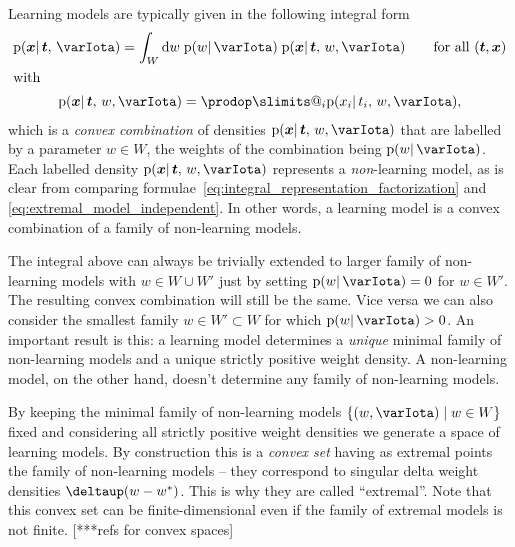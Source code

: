 \documentclass[\ifafour a4paper,12pt,\else a5paper,10pt,\fi%
onecolumn,oneside,article,%
british%
]{memoir}
\makeatletter
\theoremstyle{remark}
\theoremstyle{innote}
\def\prod{\DOTSI\prodop\slimits@}
\newcommand*{\delt}{\deltaup}%
\newcommand*{\di}{\mathrm{d}}%
\newcommand*{\suchthat}{\mid}%
\DeclarePairedDelimiter\set{\{}{\}}
\newcommand*{\pf}{\mathrm{p}}%
\renewcommand*{\|}{\mathpunct{|}}
\newcommand*{\yI}{\varIota}
\newcommand*{\yt}{\bm{t}}
\newcommand*{\yx}{\bm{x}}
\newcommand*{\yw}{w}
\newcommand*{\yws}{W}
\newcommand*{\ywp}{\yw^{*}}
\makeatother
\begin{document}
Learning models are typically given in the following integral form
\begin{subequations}
    \label{eq:integral_representation_learning_model}
  \begin{gather}
    \pf(\yx \| \yt,\, \yI) =
    \int_{\yws} \di\yw\; \pf(\yw \| \yI)\;
    \pf(\yx \| \yt,\, \yw, \yI)
    \qquad\text{for all $(\yt,\yx)$}
    \\
    \shortintertext{with}
    \label{eq:integral_representation_factorization}
    \pf(\yx \| \yt,\, \yw, \yI) =
    \prod_i  \pf(x_i \| t_i,\, \yw, \yI),
  \end{gather}
\end{subequations}
which is a \emph{convex combination} of densities
$\pf(\yx \| \yt,\, \yw, \yI)$ that are labelled by a parameter
$\yw \in \yws$, the weights of the combination being $\pf(\yw \| \yI)$.
Each labelled density $\pf(\yx \| \yt,\, \yw, \yI)$ represents a
\emph{non}-learning model, as is clear from comparing
formulae~\eqref{eq:integral_representation_factorization} and
\eqref{eq:extremal_model_independent}. In other words, a learning model is
a convex combination of a family of non-learning models.

The integral above can always be trivially extended to larger family of
non-learning models with $\yw \in \yws \cup \yws'$ just by setting
$\pf(\yw \| \yI) = 0$ for $\yw \in \yws'$. The resulting convex combination
will still be the same. Vice versa we can also consider the smallest family
$\yw \in \yws' \subset \yws$ for which $\pf(\yw \| \yI)>0$. An important
result is this: a learning model determines a \emph{unique} minimal family
of non-learning models and a unique strictly positive weight density. A
non-learning model, on the other hand, doesn't determine any family of
non-learning models.

By keeping the minimal family of non-learning models
$\set{(\yw, \yI) \suchthat \yw \in \yws}$ fixed and considering all
strictly positive weight densities we generate a space of learning models.
By construction this is a \emph{convex set} having as extremal points the
family of non-learning models -- they correspond to singular delta weight
densities $\delt(\yw-\ywp)$. This is why they are called \enquote{extremal}.
Note that this convex set can be finite-dimensional even if the family of
extremal models is not finite. [***refs for convex spaces]
\end{document}
